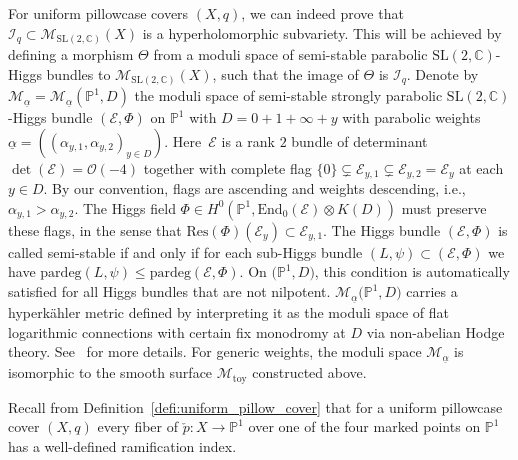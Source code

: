 \documentclass[10pt,a4paper]{amsart}
\numberwithin{equation}{section}
\theoremstyle{definition}
\newcommand{\End}{\mathrm{End}}
\newcommand{\Res}{\mathrm{Res}}
\newcommand{\pardeg}{\mathrm{pardeg}}
\newcommand{\toy}{\mathrm{toy}}
\renewcommand{\to}{\rightarrow}
\newcommand{\ualpha}{\underline{\alpha}}
\newcommand{\calE}{\mathcal{E}}
\newcommand{\calI}{\mathcal{I}}
\newcommand{\calM}{\mathcal{M}}
\newcommand{\calO}{\mathcal{O}}
\newcommand{\CC}{\mathbb{C}}
\newcommand{\PP}{\mathbb{P}}
\newcommand{\SL}{\mathrm{SL}}
\begin{document}
For uniform pillowcase covers $(X,q)$, we can indeed prove that $\calI_q \subset \calM_{\SL(2,\CC)}(X)$ is a hyperholomorphic subvariety. This will be achieved by defining a morphism $\Theta$ from a moduli space of semi-stable parabolic $\SL(2,\CC)$-Higgs bundles to $\calM_{\SL(2,\CC)}(X)$, such that the image of $\Theta$ is $\calI_q$. Denote by $\calM_{\ualpha}=\calM_{\ualpha}(\PP^1,D)$ the moduli space of semi-stable strongly parabolic $\SL(2,\CC)$-Higgs bundle $(\calE,\Phi)$ on $\PP^1$ with $D=0+1+\infty+y$ with parabolic weights $\ualpha=\left((\alpha_{y,1},\alpha_{y,2})_{y \in D}\right)$. Here~$\calE$ is a rank $2$ bundle of determinant $\det(\calE)=\calO(-4)$ together with complete flag $\{0 \} \subsetneq \calE_{y,1} \subsetneq \calE_{y,2}= \calE_y$ at each $y \in D$. By our convention, flags are ascending and weights descending, i.e., $\alpha_{y,1} > \alpha_{y,2}$. The Higgs field $\Phi \in H^0(\PP^1,\End_0(\calE)\otimes K(D))$ must preserve these flags, in the sense that $\Res(\Phi)(\calE_y) \subset \calE_{y,1}$. The Higgs bundle $(\calE,\Phi)$ is called semi-stable if and only if for each sub-Higgs bundle $(L,\psi) \subset (\calE,\Phi)$ we have $\pardeg(L,\psi)\leq \pardeg(\calE,\Phi)$. On $\bigl(\PP^1,D\bigr)$, this condition is automatically satisfied for all Higgs bundles that are not nilpotent. $\calM_{\ualpha}\bigl(\PP^1,D\bigr)$ carries a hyperk\"ahler metric defined by interpreting it as the moduli space of flat logarithmic connections with certain fix monodromy at $D$ via non-abelian Hodge theory. See~\cite{FMSW} for more details. For generic weights, the moduli space $\calM_{\underline{\alpha}}$ is isomorphic to the smooth surface $\calM_{\toy}$ constructed above.

Recall from Definition~\ref{defi:uniform_pillow_cover} that for a uniform pillowcase cover $(X,q)$ every fiber of $\check{p}\colon X \to \PP^1$ over one of the four marked points on $\PP^1$ has a well-defined ramification index.
\end{document}
